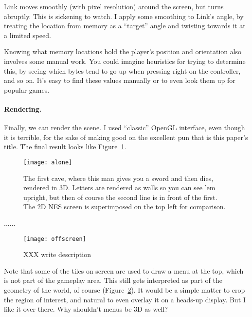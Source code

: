 \documentclass[twocolumn]{article}
\begin{document}
Link moves smoothly (with pixel resolution) around the screen, but
turns abruptly. This is sickening to watch. I apply some smoothing to
Link's angle, by treating the location from memory as a ``target''
angle and twisting towards it at a limited speed.

Knowing what memory locations hold the player's position and
orientation also involves some manual work. You could imagine
heuristics for trying to determine this, by seeing which bytes tend to
go up when pressing right on the controller, and so on. It's easy to
find these values manually or to even look them up for popular games.

\paragraph{Rendering.}

Finally, we can render the scene. I used ``classic'' OpenGL interface,
even though it is terrible, for the sake of making good on the
excellent pun that is this paper's title. The final result looks like
Figure~\ref{fig:alone}.

\begin{figure}[ht]
\begin{center}
\texttt{[image: alone]}
\end{center}\vspace{-0.1in}
\caption{The first cave, where this man gives you a sword and then dies,
rendered in 3D. Letters are rendered as walls so you can see 'em upright,
but then of course the second line is in front of the first. The 2D NES
screen is superimposed on the top left for comparison.
} \label{fig:alone}
\end{figure}

......

\begin{figure}[ht]
\begin{center}
\texttt{[image: offscreen]}
\end{center}\vspace{-0.1in}
\caption{
XXX write description
} \label{fig:offscreen}
\end{figure}


Note that some of the tiles on screen are used to draw a menu at the
top, which is not part of the gameplay area. This still gets
interpreted as part of the geometry of the world, of course
(Figure~\ref{fig:offscreen}). It would be a simple matter to crop the
region of interest, and natural to even overlay it on a heads-up
display. But I like it over there. Why shouldn't menus be 3D as well?
\end{document}
